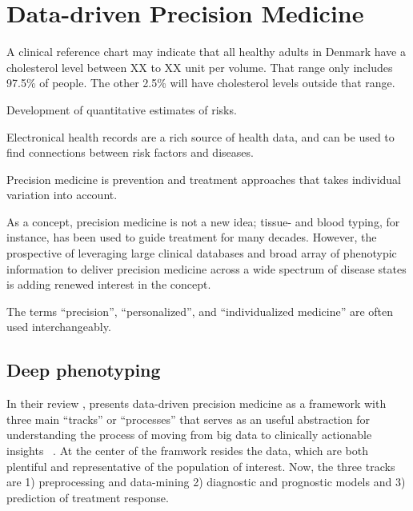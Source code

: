 \chapter{Data-driven Precision Medicine} \label{precision-medicine}












A clinical reference chart may indicate that all healthy adults in Denmark
have a cholesterol level between XX to XX unit per volume.
That range only includes 97.5\% of people.
The other 2.5\% will have cholesterol levels outside that range.

Development of quantitative estimates of risks.

Electronical health records are a rich source of health data,
and can be used to find connections between risk factors and diseases.

Precision medicine is prevention and treatment approaches
that takes individual variation into account.

As a concept, precision medicine is not a new idea;
tissue- and blood typing, for instance,  
has been used to guide treatment for many decades.
However, the prospective of leveraging large clinical databases
and broad array of phenotypic information 
to deliver precision medicine across
a wide spectrum of disease states
is adding renewed interest in the concept.

The terms
\enquote{precision},
\enquote{personalized},
and \enquote{individualized medicine}
are often used interchangeably.






\section{Deep phenotyping} \label{deep-pheno}

In their review 
, 
\citeauthor{konigWhat2017} presents data-driven precision medicine
as a framework with three main \enquote{tracks} or \enquote{processes}
that serves as an useful abstraction for understanding
the process of moving from big data
to clinically actionable insights~%
\autocite{konigWhat2017}. 
At the center of the framwork resides the data,
which are both plentiful and representative of the population of interest.
Now, the three tracks are
1) preprocessing and data-mining
2) diagnostic and prognostic models
and 3) prediction of treatment response.

